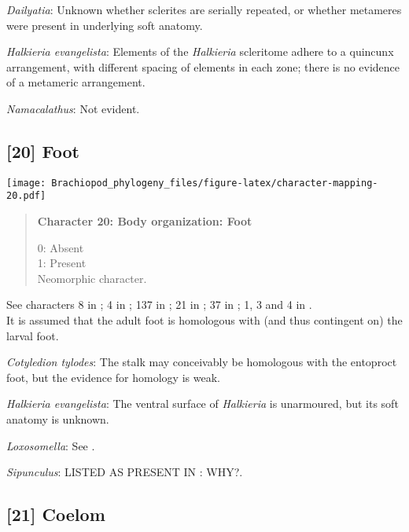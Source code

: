 \documentclass[openany]{book}
\theoremstyle{definition}
\theoremstyle{definition}
\theoremstyle{definition}
\theoremstyle{remark}
\begin{document}
\hypertarget{Dailyatia-coding-19}{}
\emph{Dailyatia}: Unknown whether sclerites are serially repeated, or
whether metameres were present in underlying soft anatomy.

\hypertarget{Halkieria_evangelista-coding-19}{}
\emph{Halkieria evangelista}: Elements of the \emph{Halkieria}
scleritome adhere to a quincunx arrangement, with different spacing of
elements in each zone; there is no evidence of a metameric arrangement.

\hypertarget{Namacalathus-coding-19}{}
\emph{Namacalathus}: Not evident.

\subsection*{{[}20{]} Foot}\label{foot}

\texttt{[image: Brachiopod\_phylogeny\_files/figure-latex/character-mapping-20.pdf]}

\begin{quote}
\textbf{Character 20: Body organization: Foot}

0: Absent\\
1: Present\\
Neomorphic character.
\end{quote}

See characters 8 in \citet{Haszprunar1996}; 4 in \citet{Vinther2008};
137 in \citet{Rouse1999}; 21 in \citet{BucklandNicks2008}; 37 in
\citet{Sutton2012}; 1, 3 and 4 in \citet{Haszprunar2008}.\\
It is assumed that the adult foot is homologous with (and thus
contingent on) the larval foot.

\hypertarget{Cotyledion_tylodes-coding-20}{}
\emph{Cotyledion tylodes}: The stalk may conceivably be homologous with
the entoproct foot, but the evidence for homology is weak.

\hypertarget{Halkieria_evangelista-coding-20}{}
\emph{Halkieria evangelista}: The ventral surface of \emph{Halkieria} is
unarmoured, but its soft anatomy is unknown.

\hypertarget{Loxosomella-coding-20}{}
\emph{Loxosomella}: See \citet{Haszprunar2008}.

\hypertarget{Sipunculus-coding-20}{}
\emph{Sipunculus}: LISTED AS PRESENT IN \citet{Smith2012}: WHY?.

\subsection*{{[}21{]} Coelom}\label{coelom}
\end{document}
